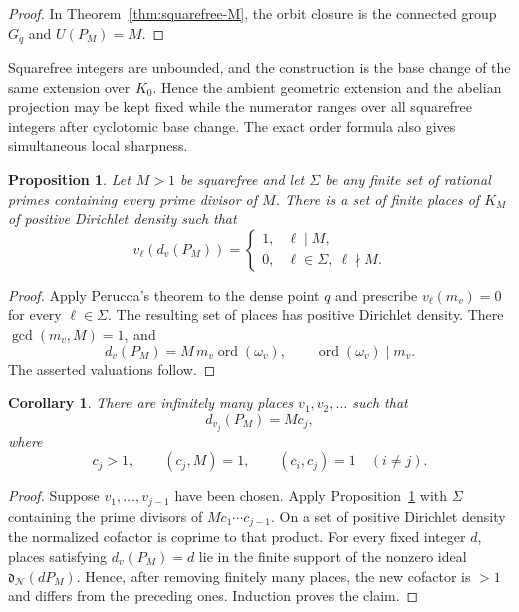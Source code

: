 \documentclass[11pt,letterpaper,reqno]{amsart}
\newtheorem{proposition}[theorem]{Proposition}
\newtheorem{corollary}[theorem]{Corollary}
\theoremstyle{definition}
\theoremstyle{remark}
\newcommand{\ord}{\operatorname{ord}}
\newcommand{\dd}{\mathfrak d}
\newcommand{\Ner}{\mathcal N}
\begin{document}
\begin{proof}
In Theorem~\ref{thm:squarefree-M}, the orbit closure is the connected group $G_q$ and
$U(P_M)=M$.  
\end{proof}
Squarefree integers are unbounded, and the construction is the
base change of the same extension over $K_0$. Hence the ambient geometric extension and the abelian projection
may be kept fixed while the numerator ranges over all squarefree integers
after cyclotomic base change. The exact order formula also gives simultaneous local sharpness.

\begin{proposition}
\label{thm:simultaneous-valuations}
Let $M>1$ be squarefree and let $\Sigma$ be any finite set of rational primes
containing every prime divisor of $M$.  There is a set of finite places of
$K_M$ of positive Dirichlet density such that
\[
 v_\ell(d_v(P_M))=
 \begin{cases}
 1,&\ell\mid M,\\
 0,&\ell\in\Sigma,\ \ell\nmid M.
 \end{cases}
\]
\end{proposition}

\begin{proof}
Apply Perucca's theorem to the dense point $q$ and prescribe
$v_\ell(m_v)=0$ for every $\ell\in\Sigma$.  The resulting set of places has
positive Dirichlet density.  There $\gcd(m_v,M)=1$, and
\[
 d_v(P_M)=M\,m_v\ord(\omega_v),
 \qquad \ord(\omega_v)\mid m_v.
\]
The asserted valuations follow.
\end{proof}

\begin{corollary}
\label{cor:pairwise-coprime-cofactors}
There are infinitely many places $v_1,v_2,\ldots$ such that
\[
 d_{v_j}(P_M)=M c_j,
\]
where
\[
 c_j>1,
 \qquad (c_j,M)=1,
 \qquad (c_i,c_j)=1\quad(i\ne j).
\]
\end{corollary}

\begin{proof}
Suppose $v_1,\ldots,v_{j-1}$ have been chosen.  Apply Proposition~\ref{thm:simultaneous-valuations} with $\Sigma$ containing the prime divisors
of $M c_1\cdots c_{j-1}$.  On a set of positive Dirichlet density the normalized cofactor
is coprime to that product.  For every fixed integer $d$, places satisfying
$d_v(P_M)=d$ lie in the finite support of the nonzero ideal
$\dd_{\Ner}(dP_M)$.  Hence, after removing finitely many places, the new
cofactor is $>1$ and differs from the preceding ones.  Induction proves the
claim.
\end{proof}
\end{document}
